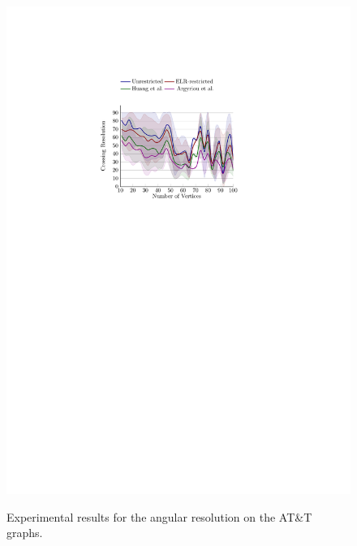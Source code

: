 \documentclass{comjnl}
\begin{document}
\begin{figure}[t!]
{	\includegraphics[scale=0.99,page=8]{figures/north_colored}}
	\caption{Experimental results for the angular resolution on the AT\&T graphs.}
	\label{fig:northAngular}
\end{figure}
\end{document}
